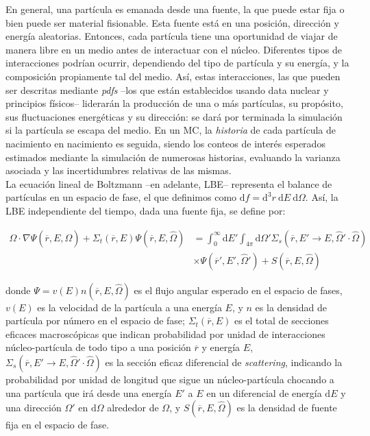 En general, una partícula es emanada desde una fuente, la que puede estar fija o bien puede ser material fisionable. Esta fuente está en una posición, dirección y energía aleatorias. Entonces, cada partícula tiene una oportunidad de viajar de manera libre en un medio antes de interactuar con el núcleo. Diferentes tipos de interacciones podrían ocurrir, dependiendo del tipo de partícula y su energía, y la composición propiamente tal del medio. Así, estas interacciones, las que pueden ser descritas mediante \emph{pdfs} --los que están establecidos usando data nuclear y principios físicos-- liderarán la producción de una o más partículas, su propósito, sus fluctuaciones energéticas y su dirección: se dará por terminada la simulación si la partícula se escapa del medio. En un MC, la \emph{historia} de cada partícula de nacimiento en nacimiento es seguida, siendo los conteos de interés esperados estimados mediante la simulación de numerosas historias, evaluando la varianza asociada y las incertidumbres relativas de las mismas. \\

La ecuación lineal de Boltzmann --en adelante, LBE-- representa el balance de partículas en un espacio de fase, el que definimos como $\text{d}f = \text{d}^3r \ \text{d}E \ \text{d}\Omega$. Así, la LBE independiente del tiempo, dada una fuente fija, se define por:

\begin{equation}
\label{1}
\begin{split}
\hat{\Omega} \cdot \nabla\Psi\left(\overline{r}, E, \hat{\Omega}\right) + \Sigma_{t}\left(\overline{r}, E\right)\Psi\left(\overline{r}, E, \hat{\Omega}\right) & = \int_{0}^{\infty} \text{d}E' \int_{4\pi} \text{d}\Omega' \Sigma_{s}\left(\overline{r}, E' \rightarrow E, \hat{\Omega}' \cdot \hat{\Omega}\right) \\
& \times \Psi\left(\overline{r}', E', \hat{\Omega}'\right) + S\left(\overline{r}, E, \hat{\Omega}\right)
\end{split}
\end{equation}

donde $\Psi = v\left(E\right) n\left(\overline{r}, E, \hat{\Omega}\right)$ es el flujo angular esperado en el espacio de fases, $v\left(E\right)$ es la velocidad de la partícula a una energía $E$, y $n$ es la densidad de partícula por número en el espacio de fase; $\Sigma_{t}\left(\overline{r}, E\right)$ es el total de secciones eficaces macroscópicas que indican probabilidad por unidad de interacciones núcleo-partícula de todo tipo a una posición $\overline{r}$ y energía $E$, $\Sigma_{s}\left(\overline{r}, E' \rightarrow E, \hat{\Omega}' \cdot \hat{\Omega} \right)$ es la sección eficaz diferencial de \emph{scattering}, indicando la probabilidad por unidad de longitud que sigue un núcleo-partícula chocando a una partícula que irá desde una energía $E'$ a $E$ en un diferencial de energía $\text{d}E$ y una dirección $\Omega'$ en $\text{d}\Omega$ alrededor de $\Omega$, y $S\left(\overline{r}, E, \hat{\Omega}\right)$ es la densidad de fuente fija en el espacio de fase. \\

